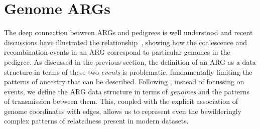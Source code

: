 \documentclass{article}
\begin{document}
\section*{Genome ARGs}
The deep connection between ARGs and pedigrees is
well understood
\citep[e.g.][]{wakeley2012genetics,gusfield2014recombinatorics,
speed2015naturereviewsgenetics}
and recent discussions have illustrated the
relationship~\citep{mathieson2020ancestry,brandt2021evaluation}, %
showing how the coalescence and recombination events in an ARG
correspond to particular genomes in the pedigree.
As discussed in the previous section, the definition of an ARG
as a data structure in terms of these two \emph{events} is problematic,
fundamentally limiting the patterns of ancestry that can be described.
Following \cite{mathieson2020ancestry}, instead of focussing on events,
we define the ARG data structure in terms of \emph{genomes} and the
patterns of transmission between them.
This, coupled with
the explicit association of genome coordinates with edges, allows
us to represent even the bewilderingly complex patterns of relatedness
present in modern datasets.
\end{document}
